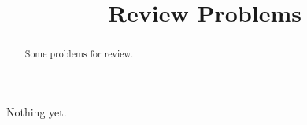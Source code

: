 \documentclass{ximera}
\title{Review Problems}
\begin{document}
\begin{abstract}
Some problems for review.
\end{abstract}
\maketitle

Nothing yet.
\end{document}
